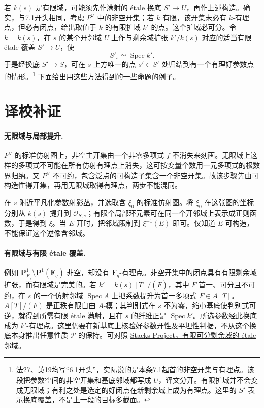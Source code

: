 \documentclass[openany,fontset=fandol]{ctexbook}
\DeclareMathOperator{\Spec}{Spec}
\newcommand{\calP}{\mathcal P}
\begin{document}
若 $k(s)$ 是有限域，可能须先作满射的 étale 换底 $S'\to U$，再作上述构造。确实，与7.1开头相同，考虑 $P^\vee$ 中的非空开集；若 $k$ 有限，该开集未必有 $k$-有理点，但必有闭点，给出取值于 $k$ 的有限扩域 $k'$ 的点。这个扩域必可分。令 $k=k(s)$，在 $s$ 的某个开邻域 $U$ 上作与剩余域扩张 $k'/k(s)$ 对应的适当有限 étale 覆盖 $S'\to U$，使
\[
 S'_s\simeq\Spec k'.
\]
于是经换底 $S'\to S$，可在 $s$ 上方唯一的点 $s'\in S'$ 处归结到有一个有理好参数点的情形。\footnote{法27、英19均写“6.1开头”，实际说的是本条7.1起首的非空开集与有理点。该段把参数空间的非空开集和基底邻域都写成 $U$，译文分开。有限扩域并不会变成无限域；有利之处是选定的好闭点在新剩余域上成为有理点。这里的 $S'$ 表示换底覆盖，不是上一段的目标多截面。}
下面给出用这些方法得到的一些命题的例子。

\section*{译校补证}
\paragraph{无限域与局部提升.}
$P^\vee$ 的标准仿射图上，非空主开集由一个非零多项式 $f$ 不消失来刻画。无限域上这样的多项式不可能在所有仿射有理点上消失，这可按变量个数用一元多项式的根数界归纳。又 $P^\vee$ 不可约，包含泛点的可构造子集含一个非空开集。故该步骤先由可构造性得开集，再用无限域取得有理点，两步不能混同。

在 $s$ 附近平凡化参数射影丛，并选取含 $\xi_0$ 的标准仿射图。将 $\xi_0$ 在这张图的坐标分别从 $k(s)$ 提升到 $\mathcal O_{S,s}$；有限个局部环元素可在同一个开邻域上表示成正则函数，于是得到 $\xi$。当 $E$ 开时，把邻域限制到 $\xi^{-1}(E)$ 即可。仅知道 $E$ 可构造，不能保证这个逆像含邻域。

\paragraph{有限域与有限 \'{e}tale 覆盖.}
例如 $\mathbf P^1_{\mathbf F_q}\setminus\mathbf P^1(\mathbf F_q)$ 非空，却没有 $\mathbf F_q$-有理点。非空开集中的闭点具有有限剩余域扩张，而有限域是完美的。若 $k'=k(s)[T]/(\overline F)$，其中 $\overline F$ 首一、可分且不可约，在 $s$ 的一个仿射邻域 $\Spec A$ 上把系数提升为首一多项式 $F\in A[T]$。$A[T]/(F)$ 是正秩有限自由 $A$-模；其判别式在 $s$ 不为零，缩小基底使判别式可逆，就得到所需有限 étale 满射，且在 $s$ 的纤维正是 $\Spec k'$。所选参数经此换底成为 $k'$-有理点。这里仍要在新基底上核验好参数开性及平坦性判据，不从这个换底本身推出任意性质 $\calP$ 的保持。可对照 \href{https://stacks.math.columbia.edu/tag/02LF}{Stacks Project，有限可分剩余域的 étale 邻域}。
\end{document}
